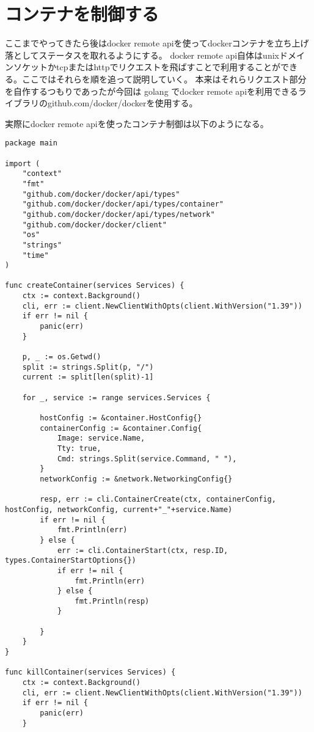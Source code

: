 \section{コンテナを制御する}

ここまでやってきたら後はdocker remote apiを使ってdockerコンテナを立ち上げ落としてステータスを取れるようにする。
docker remote api自体はunixドメインソケットかtcpまたはhttpでリクエストを飛ばすことで利用することができる。ここではそれらを順を追って説明していく。
本来はそれらリクエスト部分を自作するつもりであったが今回は golang でdocker remote apiを利用できるライブラリのgithub.com/docker/dockerを使用する。


実際にdocker remote apiを使ったコンテナ制御は以下のようになる。
\begin{verbatim}
package main

import (
    "context"
    "fmt"
    "github.com/docker/docker/api/types"
    "github.com/docker/docker/api/types/container"
    "github.com/docker/docker/api/types/network"
    "github.com/docker/docker/client"
    "os"
    "strings"
    "time"
)

func createContainer(services Services) {
    ctx := context.Background()
    cli, err := client.NewClientWithOpts(client.WithVersion("1.39"))
    if err != nil {
        panic(err)
    }

    p, _ := os.Getwd()
    split := strings.Split(p, "/")
    current := split[len(split)-1]

    for _, service := range services.Services {

        hostConfig := &container.HostConfig{}
        containerConfig := &container.Config{
            Image: service.Name,
            Tty: true,
            Cmd: strings.Split(service.Command, " "),
        }
        networkConfig := &network.NetworkingConfig{}

        resp, err := cli.ContainerCreate(ctx, containerConfig, hostConfig, networkConfig, current+"_"+service.Name)
        if err != nil {
            fmt.Println(err)
        } else {
            err := cli.ContainerStart(ctx, resp.ID, types.ContainerStartOptions{})
            if err != nil {
                fmt.Println(err)
            } else {
                fmt.Println(resp)
            }

        }
    }
}

func killContainer(services Services) {
    ctx := context.Background()
    cli, err := client.NewClientWithOpts(client.WithVersion("1.39"))
    if err != nil {
        panic(err)
    }


\end{verbatim}
